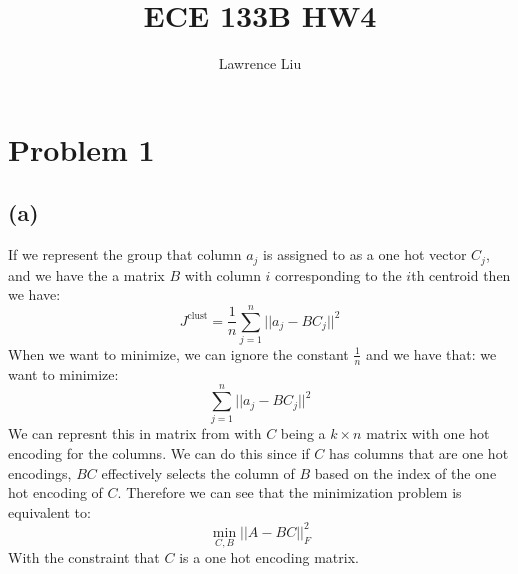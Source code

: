 \documentclass[11pt]{article}
\author{Lawrence Liu}
\title{ECE 133B HW4}
\begin{document}
\maketitle
\section*{Problem 1}
\subsection*{(a)}
If we represent the group that column $a_j$ is assigned to as a one hot vector 
$C_j$, and we have the a matrix $B$ with column $i$ 
corresponding to the $i$th centroid then we have:
$$J^{\text{clust}}=\frac{1}{n}\sum_{j=1}^{n}||a_j-BC_j||^2$$
When we want to minimize, we can ignore the constant $\frac{1}{n}$ and we have that:
we want to minimize:
$$\sum_{j=1}^{n}||a_j-BC_j||^2$$
We can represnt this in matrix from with $C$ being a $k\times n$ matrix with one hot 
encoding for the columns. We can do this since if $C$ has columns that are one hot encodings, $BC$ effectively 
selects the column of $B$ based on the index of the one hot encoding of $C$. Therefore we can see
that the minimization problem is equivalent to:
$$\min_{C,B}||A-BC||_{F}^2$$
With the constraint that $C$ is a one hot encoding matrix.
\end{document}
